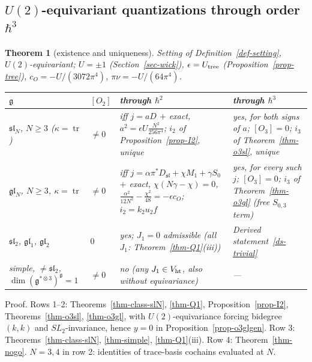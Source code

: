 \documentclass[10pt,a4paper]{article}
\numberwithin{equation}{section}
\newtheorem{theorem}{Theorem}[section]
\theoremstyle{definition}
\theoremstyle{remark}
\newcommand{\tr}{\operatorname{tr}}
\newcommand{\g}{\mathfrak g}
\newcommand{\fsl}{\mathfrak{sl}}
\newcommand{\fgl}{\mathfrak{gl}}
\newcommand{\Vht}{V_{\rm ht}}
\newcommand{\uf}{u_2f}
\begin{document}
\subsection{\texorpdfstring{$U(2)$-equivariant quantizations through order $\hbar^3$}{U(2)-equivariant quantizations through order hbar3}}

\begin{theorem}[existence and uniqueness]\label{thm-main}
Setting of Definition~\ref{def-setting}, $U(2)$-equivariant; $U=\pm1$ (Section~\ref{sec-wick}), $\epsilon=U_{\rm tree}$ (Proposition~\ref{prop-tree}), $c_O=-U/(3072\pi^4)$, $\pi\nu=-U/(64\pi^4)$.
\begin{center}
{\small
\begin{tabular}{@{}>{\raggedright\arraybackslash}p{3.0cm}>{\raggedright\arraybackslash}p{1.3cm}>{\raggedright\arraybackslash}p{5.7cm}>{\raggedright\arraybackslash}p{5.4cm}@{}}
\toprule
$\g$ & $[O_2]$ & through $\hbar^2$ & through $\hbar^3$\\
\midrule
$\fsl_N$, $N\ge3$ ($\kappa=\tr$) & $\ne0$ & iff $j=aD$ $+$ exact, $a^2=\epsilon U\frac{N^2}{256\pi^4}$; $i_2$ of Proposition~\ref{prop-I2}, unique & yes, for both signs of $a$; $[O_3]=0$; $i_3$ of Theorem~\ref{thm-o3sl}, unique\\
$\fgl_N$, $N\ge3$, $\kappa=\tr$ & $\ne0$ & iff $j=\alpha\pi^*D_{\fsl}+\chi M_1+\gamma S_0$ $+$ exact, $\chi(N\gamma-\chi)=0$, $\frac{\alpha^2}{12N^2}-\frac{\chi^2}{48}=-\epsilon c_O$; $i_2=k_2\uf$ & yes, for every such $j$; $[O_3]=0$; $i_3$ of Theorem~\ref{thm-o3gl} (free $S_{0,3}$ term)\\
$\fsl_2$, $\fgl_1$, $\fgl_2$ & $0$ & yes; $J_1=0$ admissible (all $J_1$: Theorem~\ref{thm-Q1}(iii)) & Derived statement~\ref{ds-trivial}\\
simple, $\ne\fsl_2$, $\dim(\g^{*\otimes3})^\g=1$ & $\ne0$ & no (any $J_1\in\Vht$, also without equivariance) & ---\\
\bottomrule
\end{tabular}}
\end{center}
\end{theorem}
Proof. Rows 1--2: Theorems~\ref{thm-class-slN}, \ref{thm-Q1}, Proposition~\ref{prop-I2}, Theorems~\ref{thm-o3sl}, \ref{thm-o3gl}, with $U(2)$-equivariance forcing bidegree $(k,k)$ and $SL_2$-invariance, hence $y=0$ in Proposition~\ref{prop-o3glgen}. Row 3: Theorems~\ref{thm-class-slN}, \ref{thm-simple}, \ref{thm-Q1}(iii). Row 4: Theorem~\ref{thm-nogo}. $N=3,4$ in row 2: identities of trace-basis cochains evaluated at $N$.
\end{document}
